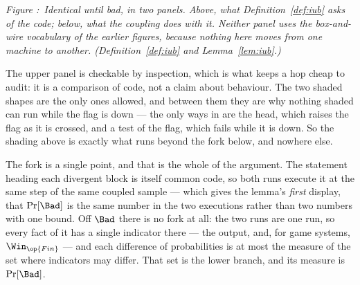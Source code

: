 \documentclass[10pt,oneside,openany]{book}
\newcounter{diagram}
\newcommand{\figcaption}[2]{%
  \par\smallskip
  \refstepcounter{diagram}\label{#1}%
  \parbox{0.92\textwidth}{\footnotesize\itshape
    \textcolor{accent}{Figure \thediagram:}\ #2\par}}
\theoremstyle{accentdef}
\theoremstyle{accentplain}
\begin{document}
\begin{center}
\figcaption{fig:iub}{Identical until bad, in two panels. Above, what Definition~\ref{def:iub} asks of the code; below, what the coupling does with it. Neither panel uses the box-and-wire vocabulary of the earlier figures, because nothing here moves from one machine to another. (Definition~\ref{def:iub} and Lemma~\ref{lem:iub}.)}
\end{center}

The upper panel is checkable by inspection, which is what keeps a hop cheap to audit: it is a
comparison of code, not a claim about behaviour. The two shaded shapes are the only ones allowed,
and between them they are why nothing shaded can run while the flag is down --- the only ways in
are the head, which raises the flag as it is crossed, and a test of the flag, which fails while it
is down. So the shading above is exactly what runs beyond the fork below, and nowhere else.

The fork is a single point, and that is the whole of the argument. The statement heading each
divergent block is itself common code, so both runs execute it at the same step of the same
coupled sample --- which gives the lemma's \emph{first} display, that $\Pr[\Bad]$ is the same
number in the two executions rather than two numbers with one bound. Off $\Bad$ there is no fork
at all: the two runs are one run, so every fact of it has a single indicator there --- the output,
and, for game systems, $\Win_{\op{Fin}}$ --- and each difference of probabilities is at most the
measure of the set where indicators may differ. That set is the lower branch, and its measure is
$\Pr[\Bad]$.
\end{document}
